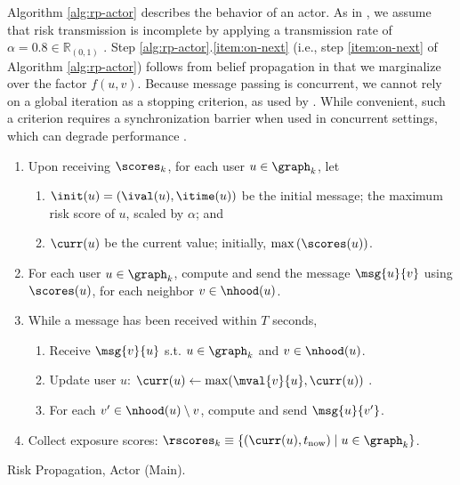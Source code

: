 \par Algorithm \ref{alg:rp-actor} describes the behavior of an actor. As in \cite{Ayday2021}, we assume that risk transmission is incomplete by applying a transmission rate of $\alpha = 0.8 \in \mathbb{R}_{(0, 1)}$ \cite{Hamner2020}. Step \ref{alg:rp-actor}.\ref{item:on-next} (i.e., step \ref{item:on-next} of Algorithm \ref{alg:rp-actor}) follows from belief propagation in that we marginalize over the factor $f(u, v)$. Because message passing is concurrent, we cannot rely on a global iteration as a stopping criterion, as used by \cite{Ayday2021}. While convenient, such a criterion requires a synchronization barrier when used in concurrent settings, which can degrade performance \cite{Han2015}.
\begin{algorithm}[tb]
	\begin{enumerate}
		\item Upon receiving $\scores_k$, for each user $u \in \graph_k$, let \label{item:attrs}
		\begin{enumerate}
			\item $\init(u) = (\ival(u), \itime(u))$ be the initial message; the maximum risk score of $u$, scaled by $\alpha$; and
			\item $\curr(u)$ be the current value; initially, $\max\left(\scores(u)\right)$.
		\end{enumerate}
		\item For each user $u \in \graph_k$, compute and send the message $\msg{u}{v}$ using $\scores(u)$, for each neighbor $v \in \nhood(u)$. \label{item:init-msg}
		\item While a message has been received within $T$ seconds, \label{item:while}
		\begin{enumerate}
			\item Receive $\msg{v}{u}$ s.t. $u \in \graph_k$ and $v \in \nhood(u)$.
			\item Update user $u$: $\curr(u) \leftarrow \max(\mval{v}{u}, \curr(u))$ \label{item:on-initial}.
			\item For each $v' \in \nhood(u) \setminus v$, compute and send $\msg{u}{v'}$.\label{item:on-next}
		\end{enumerate}
		\item Collect exposure scores: $\rscores_k \equiv \{(\curr(u), t_{\text{now}}) \mid u \in \graph_k\}$.
	\end{enumerate}
	\caption{Risk Propagation, Actor (Main).}
	\label{alg:rp-actor}
\end{algorithm}

